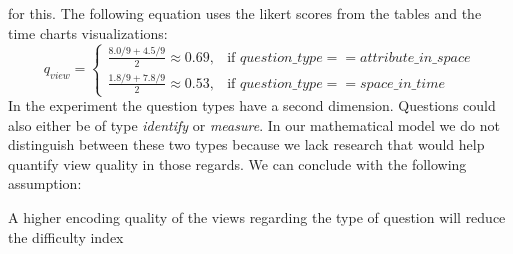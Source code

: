 for this. The following equation uses the likert scores from the tables and the time charts visualizations:
\begin{equation} \label{qualityViewEquation}
    q_{view}= 
    \begin{cases}
        \frac{8.0 / 9 + 4.5 / 9}{2} \approx 0.69,& \text{if } question\_type == attribute\_in\_space \\
        \frac{1.8 / 9 + 7.8 / 9}{2} \approx 0.53,& \text{if } question\_type == space\_in\_time 
    \end{cases}
\end{equation}
In the experiment the question types have a second dimension. Questions could also either be of type \textit{identify} or \textit{measure}. In our mathematical model we do not distinguish between
these two types because we lack research that would help quantify view quality in those regards. We can conclude with the
following assumption:
\begin{statements}[resume]
    \item A higher encoding quality of the views regarding the type of question will reduce the difficulty index
\end{statements}
